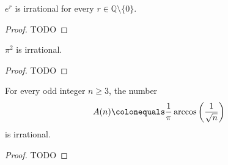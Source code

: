 \begin{theorem}
  \label{e_pow_irrational}
  \label{book.irrational.Theorem_1}
  \leanok
  \(e^r\) is irrational for every \(r\in\mathbb{Q}\setminus\{0\}\).
\end{theorem}
\begin{proof}
  TODO
\end{proof}


\begin{theorem}
  \label{pi_pow_2_irrational}
  \label{book.irrational.Theorem_2}
  \leanok
  \(\pi^2\) is irrational.
\end{theorem}
\begin{proof}
  TODO
\end{proof}

\begin{theorem}
  \label{arccos_irrational}
  \label{book.irrational.Theorem_3}
  \leanok
  For every odd integer \(n \ge 3\), the number
  \[
  A(n)\colonequals \frac{1}{\pi}\arccos\left(\frac{1}{\sqrt{n}}\right)
  \]
  is irrational.
\end{theorem}
\begin{proof}
  TODO
\end{proof}
